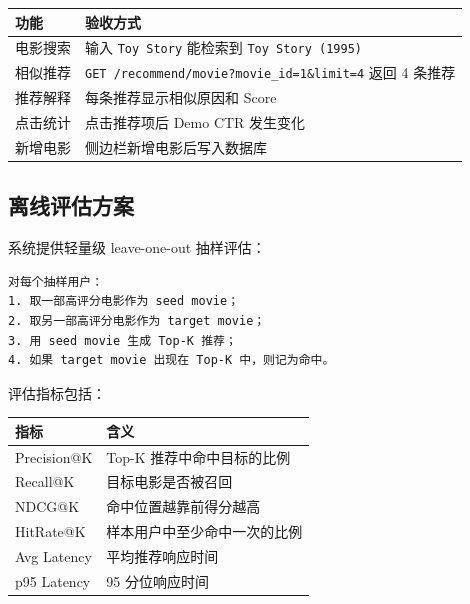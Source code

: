 \begin{center}
\begin{tabular}{ll}
\toprule
\textbf{功能} & \textbf{验收方式} \\
\midrule
电影搜索   & 输入 \texttt{Toy Story} 能检索到 \texttt{Toy Story (1995)} \\
相似推荐   & \texttt{GET /recommend/movie?movie\_id=1\&limit=4} 返回 4 条推荐 \\
推荐解释   & 每条推荐显示相似原因和 Score \\
点击统计   & 点击推荐项后 Demo CTR 发生变化 \\
新增电影   & 侧边栏新增电影后写入数据库 \\
\bottomrule
\end{tabular}
\end{center}

\subsection{离线评估方案}

系统提供轻量级 leave-one-out 抽样评估：

\begin{verbatim}
对每个抽样用户：
1. 取一部高评分电影作为 seed movie；
2. 取另一部高评分电影作为 target movie；
3. 用 seed movie 生成 Top-K 推荐；
4. 如果 target movie 出现在 Top-K 中，则记为命中。
\end{verbatim}

评估指标包括：

\begin{center}
\begin{tabular}{ll}
\toprule
\textbf{指标} & \textbf{含义} \\
\midrule
Precision@K & Top-K 推荐中命中目标的比例 \\
Recall@K    & 目标电影是否被召回 \\
NDCG@K      & 命中位置越靠前得分越高 \\
HitRate@K   & 样本用户中至少命中一次的比例 \\
Avg Latency & 平均推荐响应时间 \\
p95 Latency & 95 分位响应时间 \\
\bottomrule
\end{tabular}
\end{center}

\newpage
